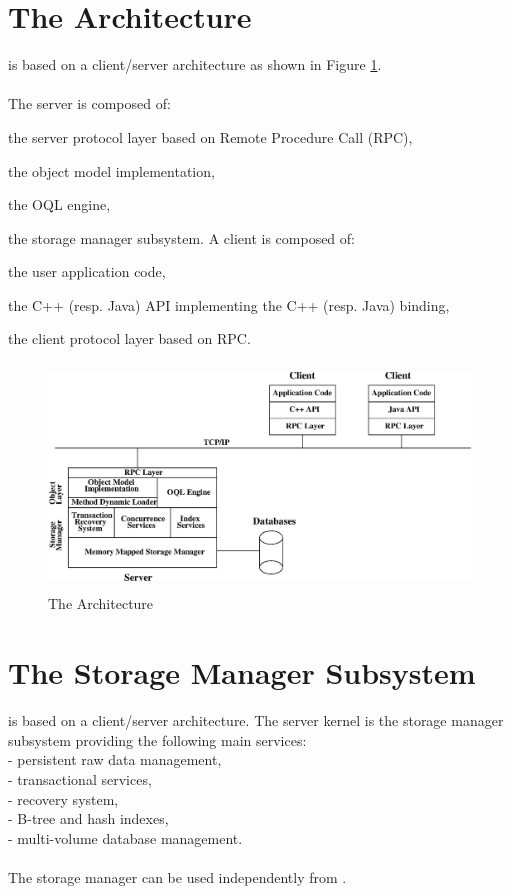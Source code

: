 \section{The Architecture}
\eyedb is based on a client/server architecture as shown in Figure
\ref{arch}.
\\
\\
The \eyedb server is composed of:
\bi
\item the server protocol layer based on Remote Procedure Call (RPC),
\item the object model implementation,
\item the OQL engine,
\item the storage manager subsystem.
\ei
A client is composed of:
\bi
\item the user application code,
\item the C++ (resp. Java) API implementing the C++ (resp. Java) binding,
\item the client protocol layer based on RPC.
\ei
\begin{figure}[!th]
\centering
\includegraphics[height=60mm]{figures/arch.eps}
\caption{The \eyedb Architecture}
\label{arch}
\end{figure}
\section{The Storage Manager Subsystem}
\eyedb is based on a client/server architecture.
The server kernel is the storage manager subsystem providing the
\vspace{2mm}
following main services:\\
\ixy - persistent raw data management,\\
\ixy - transactional services,\\
\ixy - recovery system,\\
\ixy - B-tree and hash indexes,\\
\ixy - multi-volume database management.\\ \\
The storage manager can be used independently from \eyedbX.

